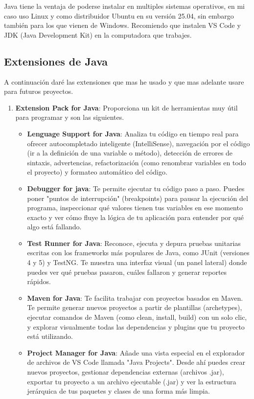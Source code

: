 Java tiene la ventaja de poderse instalar en multiples sistemas operativos, en mi caso uso Linux y como distribuidor Ubuntu en su versión 25.04, sin embargo también para los que vienen de Windows. Recomiendo que instalen VS Code y JDK (Java Development Kit) en la computadora que trabajes.

\subsection{Extensiones de Java}
A continuación daré las extensiones que mas he usado y que mas adelante usare para futuros proyectos.
\begin{enumerate}
	\item \textbf{Extension Pack for Java}: Proporciona un kit de herramientas muy útil para programar y son las siguientes.
	\begin{itemize}
		\item \textbf{Lenguage Support for Java}: Analiza tu código en tiempo real para ofrecer autocompletado inteligente (IntelliSense), navegación por el código (ir a la definición de una variable o método), detección de errores de sintaxis, advertencias, refactorización (como renombrar variables en todo el proyecto) y formateo automático del código.
		\item \textbf{Debugger for java}: Te permite ejecutar tu código paso a paso. Puedes poner "puntos de interrupción" (breakpoints) para pausar la ejecución del programa, inspeccionar qué valores tienen tus variables en ese momento exacto y ver cómo fluye la lógica de tu aplicación para entender por qué algo está fallando.
		\item \textbf{Test Runner for Java}: Reconoce, ejecuta y depura pruebas unitarias escritas con los frameworks más populares de Java, como JUnit (versiones 4 y 5) y TestNG. Te muestra una interfaz visual (un panel lateral) donde puedes ver qué pruebas pasaron, cuáles fallaron y generar reportes rápidos.
		\item \textbf{Maven for Java}: Te facilita trabajar con proyectos basados en Maven. Te permite generar nuevos proyectos a partir de plantillas (archetypes), ejecutar comandos de Maven (como clean, install, build) con un solo clic, y explorar visualmente todas las dependencias y plugins que tu proyecto está utilizando.
		\item \textbf{Project Manager for Java}: Añade una vista especial en el explorador de archivos de VS Code llamada "Java Projects". Desde ahí puedes crear nuevos proyectos, gestionar dependencias externas (archivos .jar), exportar tu proyecto a un archivo ejecutable (.jar) y ver la estructura jerárquica de tus paquetes y clases de una forma más limpia.

\end{itemize}
\end{enumerate}
